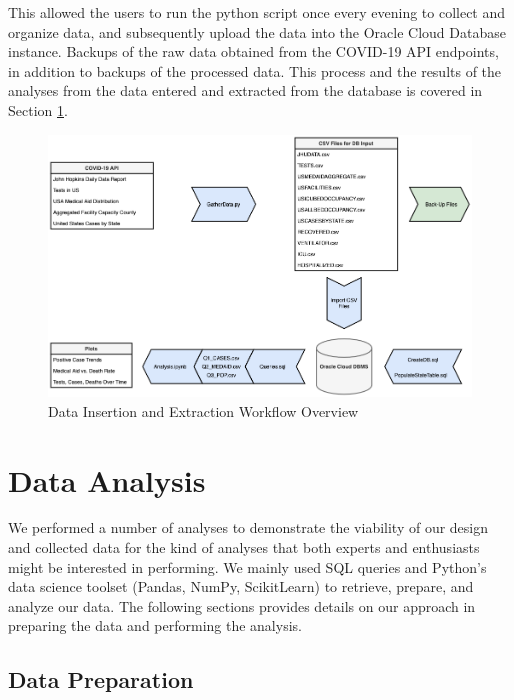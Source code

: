 \documentclass[11pt]{article}
\begin{document}
\noindent
This allowed the users to run the python script once every evening to collect and organize data, and subsequently upload the data into the Oracle Cloud Database instance. Backups of the raw data obtained from the COVID-19 API endpoints, in addition to backups of the processed data. This process and the results of the analyses from the data entered and extracted from the database is covered in Section \ref{sec:analysis}.

\FloatBarrier
\begin{figure}[h]
    \centering
    \includegraphics[width=\textwidth]{diagrams/DataInsertionExtraction.png}
    \caption{Data Insertion and Extraction Workflow Overview}
    \label{fig:my_label}
\end{figure}
\FloatBarrier

\pagebreak

\section{Data Analysis}
\label{sec:analysis}

\noindent
We performed a number of analyses to demonstrate the viability of our design and collected data for the kind of analyses that both experts and enthusiasts might be interested in performing. We mainly used SQL queries and Python's data science toolset (Pandas\cite{citepandas}, NumPy\cite{citenumpy}, ScikitLearn\cite{cite_scikit-learn}) to retrieve, prepare, and analyze our data. The following sections provides details on our approach in preparing the data and performing the analysis.

\subsection{Data Preparation}
\end{document}

